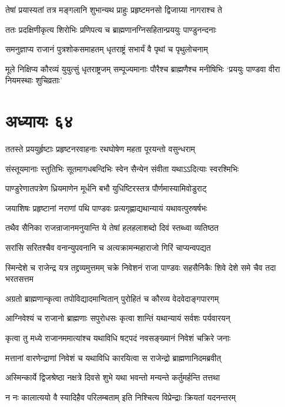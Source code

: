 \twolineshloka
{तेषां प्रयास्यतां तत्र मङ्गलानि शुभान्यथ}
{प्राहुः प्रहृष्टमनसो द्विजाग्र्या नागराश्च ते}


\twolineshloka
{ततः प्रदक्षिणीकृत्य शिरोभिः प्रणिपत्य च}
{ब्राह्मणानग्निसहितान्प्रययुः पाण्डुनन्दनाः}


\twolineshloka
{समनुज्ञाप्य राजानं पुत्रशोकसमाहतम्}
{धृतराष्ट्रं सभार्यं वै पृथां च पृथुलोचनाम्}


\threelineshloka
{मूले निक्षिप्य कौरव्यं युयुत्सुं धृतराष्ट्रजम्}
{सम्पूज्यमानाः पौरैश्च ब्राह्मणैश्च मनीषिभिः}
{`प्रययुः पाण्डवा वीरा नियमस्थाः शुचिव्रताः'}


\chapter{अध्यायः ६४}
\twolineshloka
{ततस्ते प्रययुर्हृष्टाः प्रहृष्टनरवाहनाः}
{रथघोषेण महता पूरयन्तो वसुन्धराम्}


\twolineshloka
{संस्तूयमानाः स्तुतिभिः सूतमागधबन्दिभिः}
{स्वेन सैन्येन संवीता यथाऽऽदित्याः स्वरश्मिभिः}


\twolineshloka
{पाण्डुरेणातपत्रेण ध्रियमाणेन मूर्धनि}
{बभौ युधिष्टिरस्तत्र पौर्णमास्यामिवोडुराट्}


\twolineshloka
{जयाशिषः प्रहृष्टानां नराणां पथि पाण्डवः}
{प्रत्यगृह्णाद्यथान्यायं यथावत्पुरुषर्षभः}


\twolineshloka
{तथैव सैनिका राजन्राजानमनुयान्ति ये}
{तेषां हलहलाशब्दो दिवं स्तब्ध्वा व्यतिष्ठत}


\twolineshloka
{सरांसि सरितश्चैव वनान्युपवनानि च}
{अत्यक्रामन्महाराजो गिरिं चाप्यन्वपद्यत}


\threelineshloka
{स्मिन्देशे च राजेन्द्र यत्र तद्द्रव्यमुत्तमम्}
{चक्रे निवेशनं राजा पाण्डवः सहसैनिकैः}
{शिवे देशे समे चैव तदा भरतसत्तम}


\twolineshloka
{अग्रतो ब्राह्मणान्कृत्वा तपोविद्यादमान्वितान्}
{पुरोहितं च कौरव्य वेदवेदाङ्गपारगम्}


\twolineshloka
{आग्निवेश्यं च राजानो ब्राह्मणाः सपुरोधसः}
{कृत्वा शान्तिं यथान्यायं सर्वशः पर्यवारयन्}


\twolineshloka
{कृत्वा तु मध्ये राजानममात्यांश्च यथाविधि}
{षट्पदं नवसङ्ख्यानं निवेशं चक्रिरे जनाः}


\twolineshloka
{मत्तानां वारणेन्द्राणां निवेशं च यथाविधि}
{कारयित्वा स राजेन्द्रो ब्राह्मणानिदमब्रवीत्}


\twolineshloka
{अस्मिन्कार्ये द्विजश्रेष्ठा नक्षत्रे दिवसे शुभे}
{यथा भवन्तो मन्यन्ते कर्तुमर्हन्ति तत्तथा}


\twolineshloka
{न नः कालात्ययो वै स्यादिहैव परिलम्बताम्}
{इति निश्चित्य विप्रेन्द्राः क्रियतां यदनन्तरम्}


